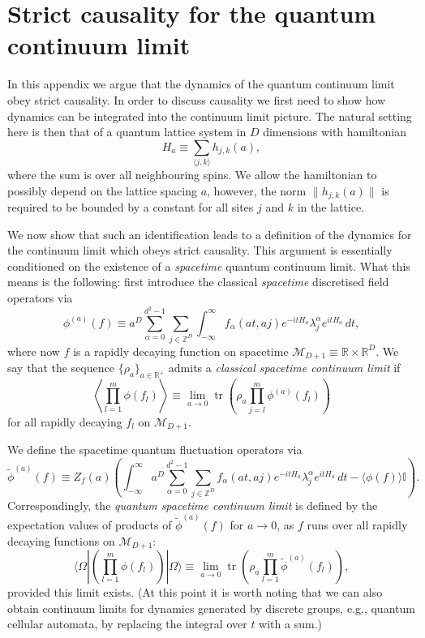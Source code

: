 \documentclass[prl,twocolumn,lengthcheck,superscriptaddress]{revtex4-1}
\newcommand{\tr}{\operatorname{tr}}
\theoremstyle{definition}
\theoremstyle{remark}
\begin{document}
\section{Strict causality for the quantum continuum limit}
In this appendix we argue that the dynamics of the quantum continuum limit obey strict causality. In order to discuss causality we first need to show how dynamics can be integrated into the continuum limit picture. The natural setting here is then that of a quantum lattice system in $D$ dimensions with hamiltonian 
\begin{equation}
	H_a \equiv \sum_{\langle j,k\rangle } h_{j,k}(a),
\end{equation}
where the sum is over all neighbouring spins. We allow the hamiltonian to possibly depend on the lattice spacing $a$, however, the norm $\|h_{j,k}(a)\|$ is required to be bounded by a constant for all sites $j$ and $k$ in the lattice. 

We now show that such an identification leads to a definition of the dynamics for the continuum limit which obeys strict causality. This argument is essentially conditioned on the existence of a \emph{spacetime} quantum continuum limit. What this means is the following: first introduce the classical \emph{spacetime} discretised field operators via
\begin{equation}
	\phi^{(a)}(f) \equiv a^D\sum_{\alpha = 0}^{d^2-1}\sum_{j\in\mathbb{Z}^D} \int_{-\infty}^\infty f_\alpha(at, aj) e^{-itH_a}\lambda^\alpha_je^{itH_a} \, dt,
\end{equation}
where now $f$ is a rapidly decaying function on spacetime $\mathcal{M}_{D+1}\equiv\mathbb{R}\times \mathbb{R}^D$. We say that the sequence 
$\{\rho_a\}_{a\in\mathbb{R}^+}$ admits a \emph{classical spacetime continuum limit} if 
\begin{equation}
	\left\langle\prod_{l=1}^m\phi(f_l)\right\rangle \equiv \lim_{a\rightarrow 0} \tr\left(\rho_a \prod_{j=l}^m\phi^{(a)}(f_l)\right)
\end{equation}
for all rapidly decaying $f_l$ on $\mathcal{M}_{D+1}$.

We define the spacetime quantum fluctuation operators via
\begin{equation}
	\widetilde{\phi}^{(a)}(f) \equiv Z_f(a)\left( \int_{-\infty}^\infty  a^D\sum_{\alpha = 0}^{d^2-1}\sum_{j\in \mathbb{Z}^D} f_\alpha(at, aj) e^{-itH_a}\lambda^\alpha_je^{itH_a} \,dt - \langle\phi(f)\rangle\mathbb{I}\right).
\end{equation}
Correspondingly, the \emph{quantum spacetime continuum limit} is defined by the expectation values of products of $\widetilde{\phi}^{(a)}(f)$ for $a\rightarrow 0$, as $f$ runs over all rapidly decaying functions on $\mathcal{M}_{D+1}$:
\begin{equation}\label{eq:qsctslimit}
	\langle\Omega|\left(\prod_{l=1}^m\widehat{\phi}(f_l)\right)|\Omega\rangle \equiv \lim_{a\rightarrow 0} \tr\left(\rho_a \prod_{l=1}^m\widetilde{\phi}^{(a)}(f_l)\right),
\end{equation}
provided this limit exists.
(At this point it is worth noting that we can also obtain continuum limits for dynamics generated by discrete groups, e.g., quantum cellular automata, by replacing the integral over $t$ with a sum.)
\end{document}
